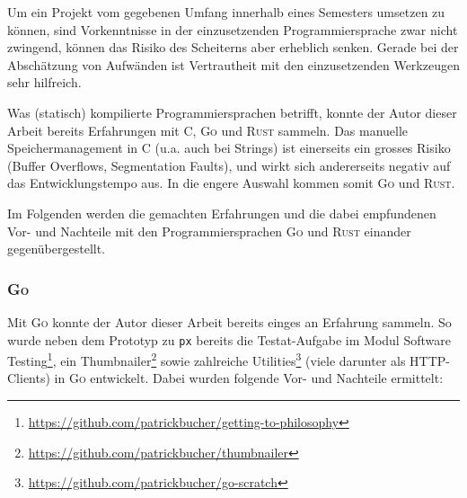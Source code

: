 Um ein Projekt vom gegebenen Umfang innerhalb eines Semesters umsetzen zu können, sind Vorkenntnisse in der einzusetzenden Programmiersprache zwar nicht zwingend, können das Risiko des Scheiterns aber erheblich senken. Gerade bei der Abschätzung von Aufwänden ist Vertrautheit mit den einzusetzenden Werkzeugen sehr hilfreich.

Was (statisch) kompilierte Programmiersprachen betrifft, konnte der Autor dieser Arbeit bereits Erfahrungen mit C, \textsc{Go} und \textsc{Rust} sammeln. Das manuelle Speichermanagement in C (u.a. auch bei Strings) ist einerseits ein grosses Risiko (Buffer Overflows, Segmentation Faults), und wirkt sich andererseits negativ auf das Entwicklungstempo aus. In die engere Auswahl kommen somit \textsc{Go} und \textsc{Rust}.

Im Folgenden werden die gemachten Erfahrungen und die dabei empfundenen Vor- und Nachteile mit den Programmiersprachen \textsc{Go} und \textsc{Rust} einander gegenübergestellt.

\subsubsection{\textsc{Go}}

Mit \textsc{Go} konnte der Autor dieser Arbeit bereits einges an Erfahrung sammeln. So wurde neben dem Prototyp zu \texttt{px} bereits die Testat-Aufgabe im Modul Software Testing\footnote{\url{https://github.com/patrickbucher/getting-to-philosophy}}, ein Thumbnailer\footnote{\url{https://github.com/patrickbucher/thumbnailer}} sowie zahlreiche Utilities\footnote{\url{https://github.com/patrickbucher/go-scratch}} (viele darunter als HTTP-Clients) in \textsc{Go} entwickelt. Dabei wurden folgende Vor- und Nachteile ermittelt:

